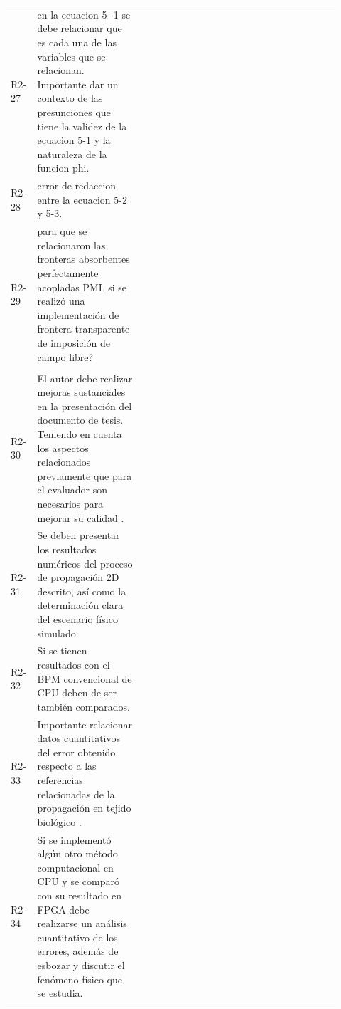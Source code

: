 \documentclass[11pt,letterpaper,landscape]{article}
\newcommand{\reviewsection}[1]{%
  \multicolumn{3}{>{\columncolor{headerbg}}p{\dimexpr\linewidth-2\tabcolsep\relax}}{%
    \textbf{#1}
  }\\[0.3em]
}
\newcommand{\responsebox}[1]{%
  \setlength{\fboxsep}{6pt}%
  \fcolorbox{linegray}{responsebg}{%
    \parbox{\dimexpr\linewidth-2\fboxsep-2\fboxrule\relax}{%
      \if\relax\detokenize{#1}\relax
        \textbf{Respuesta al revisor:}\par\vspace{0.65cm}
        \textbf{Cambio realizado:}\par\vspace{0.65cm}
        \textbf{Ubicación en la tesis:}\par\vspace{0.45cm}
      \else
        #1
      \fi
    }%
  }%
}
\newcommand{\itemrow}[3]{%
  #1 & #2 & \responsebox{#3}\\[0.8em]
}
\begin{document}
\begin{longtable}{>{\raggedright\arraybackslash}p{0.05\linewidth}
                  >{\raggedright\arraybackslash}p{0.30\linewidth}
                  >{\raggedright\arraybackslash}p{0.57\linewidth}}
\itemrow{R2-27}{en la ecuacion 5 -1 se debe relacionar que es cada una de las variables que se relacionan. Importante dar un contexto de las presunciones que tiene la validez de la ecuacion 5-1 y la naturaleza de la funcion phi.}{}

\itemrow{R2-28}{error de redaccion entre la ecuacion 5-2 y 5-3.}{}

\itemrow{R2-29}{para que se relacionaron las fronteras absorbentes perfectamente acopladas PML si se realizó una implementación de frontera transparente de imposición de campo libre?}{}

\reviewsection{Sustentación pública}

\itemrow{R2-30}{El autor debe realizar mejoras sustanciales en la presentación del documento de tesis. Teniendo en cuenta los aspectos relacionados previamente que para el evaluador son necesarios para mejorar su calidad .}{}

\itemrow{R2-31}{Se deben presentar los resultados numéricos del proceso de propagación 2D descrito, así como la determinación clara del escenario físico simulado.}{}

\itemrow{R2-32}{Si se tienen resultados con el BPM convencional de CPU deben de ser también comparados.}{}

\itemrow{R2-33}{Importante relacionar datos cuantitativos del error obtenido respecto a las referencias relacionadas de la propagación en tejido biológico .}{}

\itemrow{R2-34}{Si se implementó algún otro método computacional en CPU y se comparó con su resultado en FPGA debe realizarse un análisis cuantitativo de los errores, además de esbozar y discutir el fenómeno físico que se estudia.}{}

\end{longtable}
\end{document}
